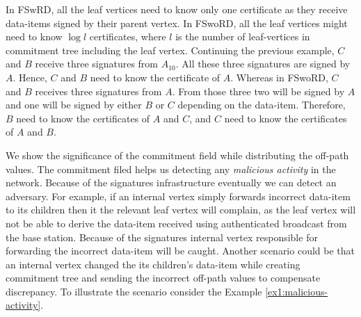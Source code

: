 		In FSwRD, all the leaf vertices need to know only one certificate as they receive data-items signed by their parent vertex.
		In FSwoRD, all the leaf vertices might need to know $\log l$ certificates, where $l$ is the number of leaf-vertices in commitment tree including the leaf vertex.
		Continuing the previous example, $C$ and $B$ receive three signatures from $A_{10}$. 
		All these three signatures are signed by $A$.
		Hence, $C$ and $B$ need to know the certificate of $A$.  
		Whereas in FSwoRD, $C$ and $B$ receives three signatures from $A$.
		From those three two will be signed by $A$ and one will be signed by either $B$ or $C$ depending on the data-item. 
		Therefore, $B$ need to know the certificates of $A$ and $C$, and $C$ need to know the certificates of $A$ and $B$.

		We show the significance of the commitment field while distributing the off-path values. 
		The commitment filed helps us detecting any \textit{malicious activity} in the network. 
		Because of the signatures infrastructure eventually we can detect an adversary. 
		For example, if an internal vertex simply forwards incorrect data-item to its children then it the relevant leaf vertex will complain, as the leaf vertex will not be able to derive the data-item received using authenticated broadcast from the base station.
		Because of the signatures internal vertex responsible for forwarding the incorrect data-item will be caught.
		Another scenario could be that an internal vertex changed the its children's data-item while creating commitment tree and sending the incorrect off-path values to compensate discrepancy. 
		To illustrate the scenario consider the Example \ref{ex1:malicious-activity}.

